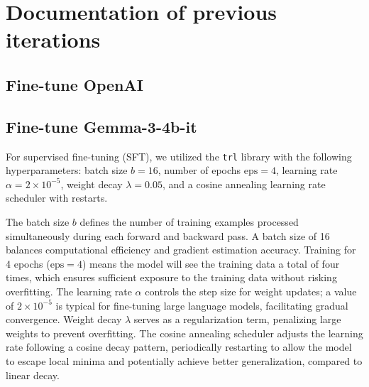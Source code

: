 
\section{Documentation of previous iterations} \label{app:previous-iterations}
\subsection{Fine-tune OpenAI} \label{app:openai-finetune}

\subsection{Fine-tune Gemma-3-4b-it} \label{app:gemma-finetune}

For supervised fine-tuning (SFT), we utilized the \texttt{trl} library with the following hyperparameters: batch size \( b = 16 \), number of epochs \( \text{eps} = 4 \), learning rate \( \alpha = 2 \times 10^{-5} \), weight decay \( \lambda = 0.05 \), and a cosine annealing learning rate scheduler with restarts.

The batch size \( b \) defines the number of training examples processed simultaneously during each forward and backward pass. A batch size of 16 balances computational efficiency and gradient estimation accuracy. Training for 4 epochs (\( \text{eps} = 4 \)) means the model will see the training data a total of four times, which ensures sufficient exposure to the training data without risking overfitting. The learning rate \( \alpha \) controls the step size for weight updates; a value of \( 2 \times 10^{-5} \) is typical for fine-tuning large language models, facilitating gradual convergence. Weight decay \( \lambda \) serves as a regularization term, penalizing large weights to prevent overfitting. The cosine annealing scheduler adjusts the learning rate following a cosine decay pattern, periodically restarting to allow the model to escape local minima and potentially achieve better generalization, compared to linear decay.

